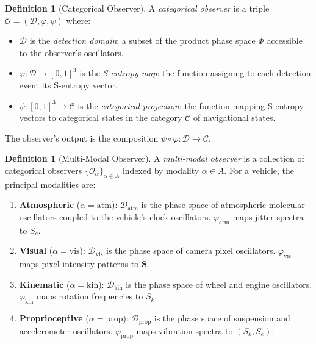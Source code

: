 \documentclass[twocolumn,10pt]{article}
\theoremstyle{definition}
\newtheorem{definition}[theorem]{Definition}
\theoremstyle{remark}
\newcommand{\Sent}{\mathbf{S}}
\newcommand{\Ocal}{\mathcal{O}}
\newcommand{\Dcal}{\mathcal{D}}
\begin{document}
\begin{definition}[Categorical Observer]\label{def:observer}
A \emph{categorical observer} is a triple $\Ocal = (\Dcal, \varphi, \psi)$
where:
\begin{itemize}
  \item $\Dcal$ is the \emph{detection domain}: a subset of the product
    phase space $\Phi$ accessible to the observer's oscillators.
  \item $\varphi: \Dcal \to [0,1]^3$ is the \emph{S-entropy map}: the
    function assigning to each detection event its S-entropy vector.
  \item $\psi: [0,1]^3 \to \mathcal{C}$ is the \emph{categorical
    projection}: the function mapping S-entropy vectors to categorical
    states in the category $\mathcal{C}$ of navigational states.
\end{itemize}
The observer's output is the composition $\psi \circ \varphi: \Dcal \to
\mathcal{C}$.
\end{definition}

\begin{definition}[Multi-Modal Observer]\label{def:multimodal-observer}
A \emph{multi-modal observer} is a collection of categorical observers
$\{\Ocal_\alpha\}_{\alpha \in A}$ indexed by modality $\alpha \in A$. For
a vehicle, the principal modalities are:
\begin{enumerate}[label=(\roman*)]
  \item \textbf{Atmospheric} ($\alpha = \mathrm{atm}$): $\Dcal_{\mathrm{atm}}$
    is the phase space of atmospheric molecular oscillators coupled to the
    vehicle's clock oscillators. $\varphi_{\mathrm{atm}}$ maps jitter
    spectra to $S_e$.
  \item \textbf{Visual} ($\alpha = \mathrm{vis}$): $\Dcal_{\mathrm{vis}}$
    is the phase space of camera pixel oscillators. $\varphi_{\mathrm{vis}}$
    maps pixel intensity patterns to $\Sent$.
  \item \textbf{Kinematic} ($\alpha = \mathrm{kin}$): $\Dcal_{\mathrm{kin}}$
    is the phase space of wheel and engine oscillators.
    $\varphi_{\mathrm{kin}}$ maps rotation frequencies to $S_k$.
  \item \textbf{Proprioceptive} ($\alpha = \mathrm{prop}$):
    $\Dcal_{\mathrm{prop}}$ is the phase space of suspension and
    accelerometer oscillators. $\varphi_{\mathrm{prop}}$ maps vibration
    spectra to $(S_k, S_e)$.
\end{enumerate}
\end{definition}
\end{document}
